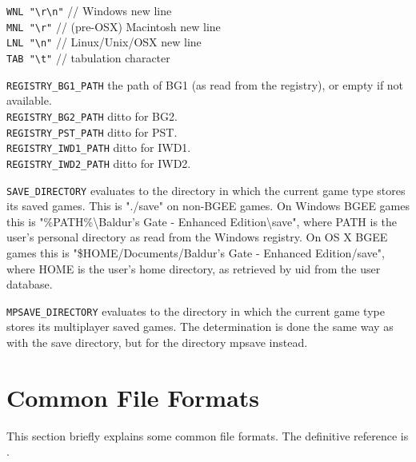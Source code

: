 \documentclass{article}
\def\t#1{{\tt #1}}
\begin{document}
\verb+WNL "\r\n"+ // Windows new line\\
\verb+MNL "\r"+ // (pre-OSX) Macintosh new line\\
\verb+LNL "\n"+ // Linux/Unix/OSX new line\\
\verb+TAB "\t"+ // tabulation character

\verb+REGISTRY_BG1_PATH+ the path of BG1 (as read from the registry), or empty if not available.\\
\verb+REGISTRY_BG2_PATH+ ditto for BG2.\\
\verb+REGISTRY_PST_PATH+ ditto for PST.\\
\verb+REGISTRY_IWD1_PATH+ ditto for IWD1.\\
\verb+REGISTRY_IWD2_PATH+ ditto for IWD2.

\verb+SAVE_DIRECTORY+ evaluates to the directory in which the current game type stores its saved games. This is "./save" on non-BGEE games. On Windows BGEE games this is "\%PATH\%\backslash Baldur's Gate - Enhanced Edition\backslash save", where PATH is the user's personal directory as read from the Windows registry. On OS X BGEE games this is "\$HOME/Documents/Baldur's Gate - Enhanced Edition/save", where HOME is the user's home directory, as retrieved by uid from the user database.

\verb+MPSAVE_DIRECTORY+ evaluates to the directory in which the current game type stores its multiplayer saved games. The determination is done the same way as with the save directory, but for the directory mpsave instead.

\section{Common File Formats}

This section briefly explains some common file formats. The definitive
reference is
.
\end{document}
